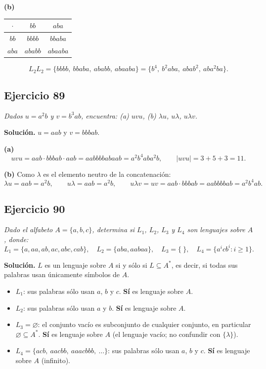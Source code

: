 \medskip
\noindent\textbf{(b)}

\begin{center}
    \begin{tabular}{|c|c|c|}
        \hline
        $\cdot$ & $bb$ & $aba$ \\
        \hline
        $bb$  & $bbbb$  & $bbaba$  \\
        $aba$ & $ababb$ & $abaaba$ \\
        \hline
    \end{tabular}
\end{center}
\[
L_2 L_2 = \{bbbb,\ bbaba,\ ababb,\ abaaba\}
= \{b^4,\ b^2aba,\ abab^2,\ aba^2ba\}.
\]

\subsection*{Ejercicio 89}

\noindent\textit{Dados $u = a^2 b$ y $v = b^3 a b$, encuentra: (a) $uvu$, (b)
    $\lambda u$, $u\lambda$, $u\lambda v$.}

\medskip
\noindent\textbf{Solución.} $u = aab$ y $v = bbbab$.

\medskip
\noindent\textbf{(a)}
\[
uvu = aab \cdot bbbab \cdot aab = aabbbbabaab = a^2 b^4 a b a^2 b,
\qquad |uvu| = 3 + 5 + 3 = 11 .
\]

\noindent\textbf{(b)} Como $\lambda$ es el elemento neutro de la concatenación:
\[
\lambda u = aab = a^2 b, \qquad
u\lambda = aab = a^2 b, \qquad
u\lambda v = uv = aab \cdot bbbab = aabbbbab = a^2 b^4 a b .
\]

\subsection*{Ejercicio 90}

\noindent\textit{Dado el alfabeto $A = \{a, b, c\}$, determina si $L_1$, $L_2$, $L_3$
    y $L_4$ son lenguajes sobre $A$, donde:}
\[
L_1 = \{a, aa, ab, ac, abc, cab\}, \quad
L_2 = \{aba, aabaa\}, \quad
L_3 = \{\ \}, \quad
L_4 = \{a^i c b^i : i \geq 1\}.
\]

\medskip
\noindent\textbf{Solución.} $L$ es un lenguaje sobre $A$ si y sólo si
$L \subseteq A^*$, es decir, si todas sus palabras usan únicamente símbolos de $A$.
\begin{itemize}
    \item $L_1$: sus palabras sólo usan $a$, $b$ y $c$. \quad \textbf{Sí} es lenguaje
    sobre $A$.
    \item $L_2$: sus palabras sólo usan $a$ y $b$. \quad \textbf{Sí} es lenguaje sobre $A$.
    \item $L_3 = \varnothing$: el conjunto vacío es subconjunto de cualquier conjunto,
    en particular $\varnothing \subseteq A^*$. \quad \textbf{Sí} es lenguaje sobre
    $A$ (el lenguaje vacío; no confundir con $\{\lambda\}$).
    \item $L_4 = \{acb,\ aacbb,\ aaacbbb,\ \dots\}$: sus palabras sólo usan $a$, $b$ y
    $c$. \quad \textbf{Sí} es lenguaje sobre $A$ (infinito).
\end{itemize}


